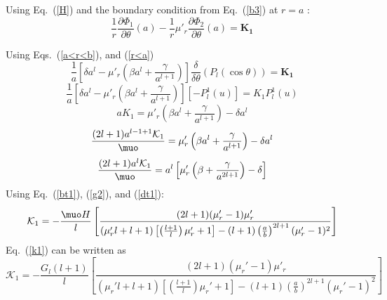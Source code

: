 Using Eq.~(\ref{H}) and the boundary condition from Eq.~(\ref{b3}) at $r=a$ :
$$\frac{1}{r}\frac{\partial \Phi_1}{\partial \theta}(a)-\frac{1}{r}\mu'_r\frac{\partial \Phi_2}{\partial \theta}(a)=\bm{K_1}  $$

Using Eqs.~(\ref{a<r<b}), and (\ref{r<a})
$$\frac{1}{a}\left[\delta a^l-\mu'_r\left(\beta a^l+\frac{\gamma}{a^{l+1}}\right)\right]\frac{\delta}{\delta \theta}(P_l(\cos\theta))= \bm{K_1}$$
$$\frac{1}{a}\left[\delta a^l-\mu'_r\left(\beta a^l+\frac{\gamma}{a^{l+1}}\right)\right][-P_l^1(u)]= K_1 P_l^1(u)$$
$$a K_1=\mu'_r\left(\beta a^l+\frac{\gamma}{a^{l+1}}\right)-\delta a^l$$
$$\frac{(2l+1)a^{l-1+1}\mathcal{K}_1}{\muo}=\mu'_r\left(\beta a^l+\frac{\gamma}{a^{l+1}}\right)-\delta a^l$$
$$\frac{(2l+1)a^l\mathcal{K}_1}{\muo}=a^l\left[\mu'_r\left(\beta +\frac{\gamma}{a^{2l+1}}\right)-\delta \right]$$
Using Eq.~(\ref{bt1}), (\ref{g2}), and (\ref{dt1}):
\begin{equation}\label{k1s}
\mathcal{K}_1=-\frac{\muo H}{l}\left[\frac{(2l+1)(\mu_r'-1)\mu'_r}{(\mu_r'l+l+1)\left[\left(\frac{l+1}{l}\right)\mu_r'+1\right]-(l+1)\left(\frac{a}{b}\right)^{2l+1}(\mu_r'-1)^2}\right]
\end{equation}
Eq.~(\ref{k1}) can be written as
\begin{equation}\label{k1b}
\mathcal{K}_1=-\frac{G_l (l+1)}{l}\left[\frac{(2l+1)(\mu_r'-1)\mu'_r}{(\mu_r'l+l+1)\left[\left(\frac{l+1}{l}\right)\mu_r'+1\right]-(l+1)\left(\frac{a}{b}\right)^{2l+1}(\mu_r'-1)^2}\right]
\end{equation}

